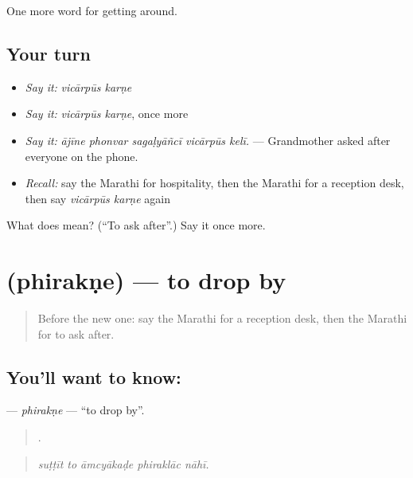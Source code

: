 \begin{grammarlens}[title={What you've built}]
One more word for getting around.
\end{grammarlens}

\subsection*{Your turn}
\begin{itemize}
\raggedright
  \item \emph{Say it:} \emph{vicārpūs karṇe}
  \item \emph{Say it:} \emph{vicārpūs karṇe}, once more
  \item \emph{Say it:} \emph{ājīne phonvar sagaḷyāñcī vicārpūs kelī.} — Grandmother asked after everyone on the phone.
  \item \emph{Recall:} say the Marathi for hospitality, then the Marathi for a reception desk, then say \emph{vicārpūs karṇe} again
\end{itemize}

\begin{tcolorbox}[breakable,colback=teal!4,colframe=teal!35!black,title={Before you move on}]
What does   mean? (\textquotedblleft{}To ask after\textquotedblright{}.) Say it once more.
\end{tcolorbox}
\section[\texorpdfstring{\mr{फिरकणे} (phirakṇe)}{फिरकणे (phirakṇe)}]{ (phirakṇe) — to drop by}

\label{lesson:MR-C414-phirakne}



\begin{quote}
Before the new one: say the Marathi for a reception desk, then the Marathi for to ask after.
\end{quote}

\subsection*{You'll want to know: }
\textbf{} — \emph{phirakṇe} — \textquotedblleft{}to drop by\textquotedblright{}.

\begin{quote}
    .
\end{quote}

\begin{quote}
\emph{suṭṭīt to āmcyākaḍe phiraklāc nāhī.}
\end{quote}

